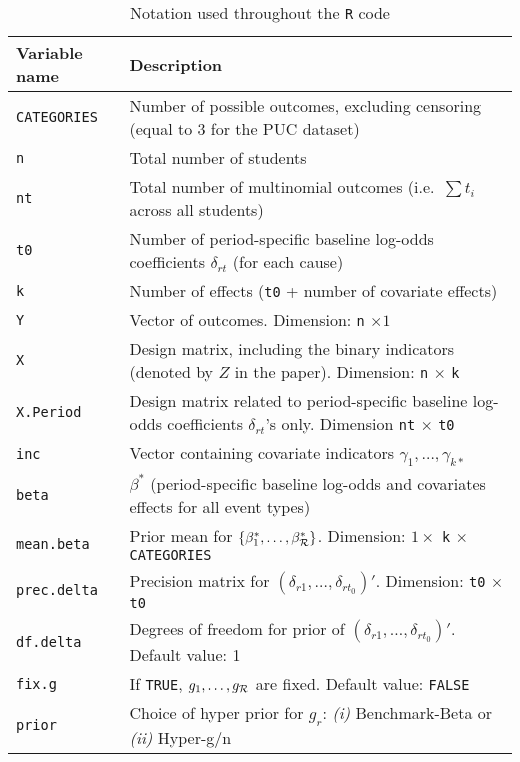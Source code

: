 \documentclass[a4paper,11pt]{article}
\theoremstyle{example}
\theoremstyle{theorem}
\theoremstyle{theorem}
\theoremstyle{proposition}
\theoremstyle{corollary}
\begin{document}
\begin{table}[H]
\caption{Notation used throughout the \texttt{R} code}
\label{tableNotation} \centering \small
\begin{tabular}{ll}
  \hline
  Variable name    & Description \\
  \hline
  \texttt{CATEGORIES}& Number of possible outcomes, excluding censoring (equal to 3 for the PUC dataset) \\
  \texttt{n}        & Total number of students \\
  \texttt{nt}        & Total number of multinomial outcomes (i.e.~$\sum t_i$ across all students) \\
  \texttt{t0}       & Number of period-specific baseline log-odds coefficients $\delta_{rt}$ (for each cause) \\
  \texttt{k}        & Number of effects (\texttt{t0} + number of covariate effects) \\
  \texttt{Y}       & Vector of outcomes. Dimension: \texttt{n} $\times 1$ \\
  \texttt{X}       & Design matrix, including the binary indicators (denoted by $Z$ in the paper). Dimension: \texttt{n} $\times$ \texttt{k}\\
  \texttt{X.Period} & Design matrix related to period-specific baseline log-odds coefficients $\delta_{rt}$'s only. Dimension \texttt{nt} $\times$ \texttt{t0} \\
  \texttt{inc}      & Vector containing covariate indicators $\gamma_1,\ldots,\gamma_{k*}$ \\
  \texttt{beta}    & $\beta^*$ (period-specific baseline log-odds and covariates effects for all event types) \\
  \texttt{mean.beta}    & Prior mean for $\{\beta^*_1,\ldots,\beta^*_{\cal R}\}$. Dimension: $1 \times$ \texttt{k} $\times$ \texttt{CATEGORIES} \\
  \texttt{prec.delta}   & Precision matrix for $(\delta_{r1},\ldots,\delta_{rt_0})'$. Dimension: \texttt{t0} $\times$ \texttt{t0}  \\
  \texttt{df.delta}     & Degrees of freedom for prior of $(\delta_{r1},\ldots,\delta_{rt_0})'$. Default value: 1 \\
  \texttt{fix.g}   & If \texttt{TRUE}, $g_1,\ldots,g_{\cal R}$ are fixed. Default value: \texttt{FALSE} \\
  \texttt{prior}   & Choice of hyper prior for $g_r$: \emph{(i)} Benchmark-Beta or \emph{(ii)} Hyper-g/n \citep[see][]{leysteel2012}\\

\end{tabular}
\end{table}
\end{document}
